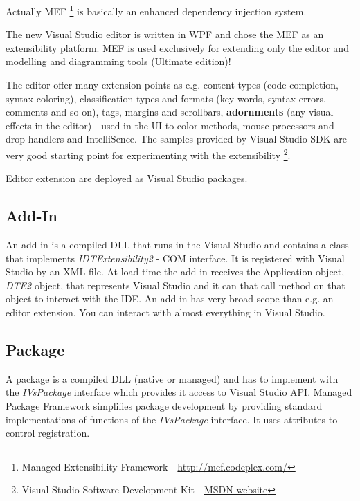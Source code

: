 Actually MEF 
\footnote{Managed Extensibility Framework - \href{http://mef.codeplex.com/}{http://mef.codeplex.com/} } 
is basically an enhanced dependency injection system. 

The new Visual Studio editor is written in WPF and chose the MEF as an extensibility platform. MEF is used exclusively for extending only the editor and modelling and diagramming tools (Ultimate edition)!

The editor offer many extension points as e.g. content types (code completion, syntax coloring), classification types and formats (key words, syntax errors, comments and so on), tags, margins and scrollbars, \textbf{adornments} (any visual effects in the editor) - used in the UI to color methods, mouse processors and drop handlers and IntelliSence. The samples provided by Visual Studio SDK are very good starting point for experimenting with the extensibility
\footnote{Visual Studio Software Development Kit - \href{http://msdn.microsoft.com/en-us/library/bb166441(v=VS.100).aspx}{MSDN website}}.

Editor extension are deployed as Visual Studio packages.

\subsection{Add-In}
An add-in is a compiled DLL that runs in the Visual Studio and contains a class that implements \textit{IDTExtensibility2} - COM interface. It is registered with Visual Studio by an XML file. At load time the add-in receives the Application object, \textit{DTE2} object, that represents Visual Studio and it can that call method on that object to interact with the IDE. An add-in has very broad scope than e.g. an editor extension. You can interact with almost everything in Visual Studio.

\subsection{Package}
A package is a compiled DLL (native or managed) and has to implement with the \textit{IVsPackage} interface which provides it access to Visual Studio API. Managed Package Framework simplifies package development by providing standard implementations of functions of the \textit{IVsPackage} interface. It uses attributes to control registration.

